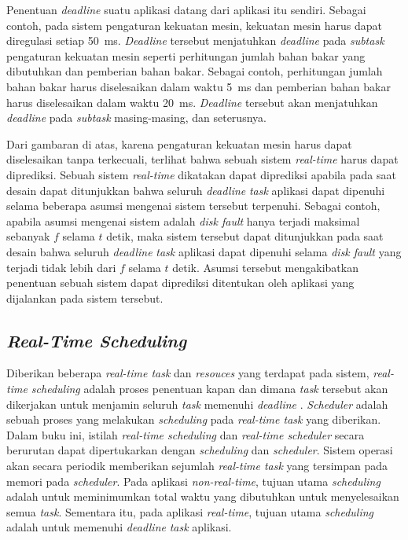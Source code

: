 Penentuan \textit{deadline} suatu aplikasi datang dari aplikasi itu sendiri.  Sebagai contoh,
pada sistem pengaturan kekuatan mesin, kekuatan mesin harus dapat diregulasi setiap
\SI{50}{\milli\second}.  \textit{Deadline} tersebut menjatuhkan \textit{deadline} pada
\textit{subtask} pengaturan kekuatan mesin seperti perhitungan jumlah bahan bakar yang
dibutuhkan dan pemberian bahan bakar.  Sebagai contoh, perhitungan jumlah bahan bakar harus
diselesaikan dalam waktu \SI{5}{\milli\second} dan pemberian bahan bakar harus diselesaikan
dalam waktu \SI{20}{\milli\second}.  \textit{Deadline} tersebut akan menjatuhkan
\textit{deadline} pada \textit{subtask} masing-masing, dan seterusnya.

Dari gambaran di atas, karena pengaturan kekuatan mesin harus dapat diselesaikan tanpa
terkecuali, terlihat bahwa sebuah sistem \textit{real-time} harus dapat diprediksi.  Sebuah
sistem \textit{real-time} dikatakan dapat diprediksi apabila pada saat desain dapat ditunjukkan
bahwa seluruh \textit{deadline} \textit{task} aplikasi dapat dipenuhi selama beberapa asumsi
mengenai sistem tersebut terpenuhi.  Sebagai contoh, apabila asumsi mengenai sistem adalah
\textit{disk fault} hanya terjadi maksimal sebanyak $f$ selama $t$ detik, maka sistem tersebut
dapat  ditunjukkan pada saat desain bahwa seluruh \textit{deadline} \textit{task} aplikasi dapat
dipenuhi selama \textit{disk fault} yang terjadi tidak lebih dari $f$ selama $t$ detik.  Asumsi
tersebut mengakibatkan penentuan sebuah sistem dapat diprediksi ditentukan oleh aplikasi yang
dijalankan pada sistem tersebut.

\subsection{\textit{Real-Time Scheduling}}

Diberikan beberapa \textit{real-time task} dan \textit{resouces} yang terdapat pada sistem,
\textit{real-time scheduling} adalah proses penentuan kapan dan dimana \textit{task} tersebut
akan dikerjakan untuk menjamin seluruh \textit{task} memenuhi \textit{deadline}
\citep[pp.~8-9]{Shin1994}.  \textit{Scheduler} adalah sebuah proses yang melakukan
\textit{scheduling} pada \textit{real-time task} yang diberikan.  Dalam buku ini, istilah
\textit{real-time scheduling} dan \textit{real-time scheduler} secara berurutan dapat
dipertukarkan dengan \textit{scheduling} dan \textit{scheduler}.  Sistem operasi akan secara
periodik memberikan sejumlah \textit{real-time task} yang tersimpan pada memori pada
\textit{scheduler}.  Pada aplikasi \textit{non-real-time}, tujuan utama \textit{scheduling}
adalah untuk meminimumkan total waktu yang dibutuhkan untuk menyelesaikan semua \textit{task}.
Sementara itu, pada aplikasi \textit{real-time}, tujuan utama \textit{scheduling} adalah untuk
memenuhi \textit{deadline} \textit{task} aplikasi.

